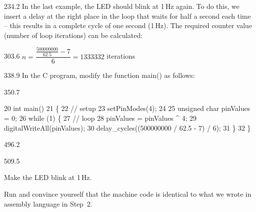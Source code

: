 \documentclass{aslab}
\makeatletter
\newcommand*\aN[1]{\textcolor{codeorange}{#1}}%
\newcommand*\aI[1]{\textcolor{codegreen}{#1}}%
\newcommand*\aK[1]{\textcolor{codered}{#1}}%
\newcommand*\aC[1]{\textcolor{codepurple}{#1}}%
\newenvironment{asmlisting}[1][11]{\par
  \edef\asm@bs{\the\baselineskip}\fontsize{#1bp}{\asm@bs}\selectfont
  \ttfamily\asm@setup}{\par}
\makeatother
\begin{document}
\begin{region}[pitch=13.17]{234.2}
In the last example, the LED should blink at 1\,Hz again. To do this, we
insert a delay at the right place in the loop that waits for half a second
each time -- this results in a complete cycle of one second (1\,Hz). The
required counter value (number of loop iterations) can be calculated:
\end{region}

\begin{region}[x=92.7,right=0]{303.6}
\fontsize{13.2bp}{14bp}\selectfont
$n = \dfrac{\frac{500000000}{62.5} - 7}{6} = 1333332$
{\normalsize iterations}
\end{region}

\begin{region}{338.9}
In the C program, modify the function main() as follows:
\end{region}

\begin{region}[pitch=10]{350.7}
\begin{asmlisting}[9]
 \aN{20} \aI{int} main()
 \aN{21} \{
 \aN{22}     \aC{// setup}
 \aN{23}     setPinModes(\aK{4});
 \aN{24}
 \aN{25}     \aI{unsigned} \aI{char} pinValues = \aK{0};
 \aN{26}     \aN{while} (\aK{1}) \{
 \aN{27}         \aC{// loop}
 \aN{28}         pinValues = pinValues \textasciicircum{} 4;
 \aN{29}         digitalWriteAll(pinValues);
 \aN{30}         delay\_cycles((\aK{500000000} / \aK{62.5} - \aK{7}) / \aK{6});
 \aN{31}     \}
 \aN{32} \}
\end{asmlisting}
\end{region}

\begin{region}{496.2}
\end{region}

\begin{region}[pitch=13.3]{509.5}
\begin{numlist}
\item Make the LED blink at 1\,Hz.
\item Run  and
  convince yourself that the machine code is identical to what we wrote in
  assembly language in Step~2.
\end{numlist}
\end{region}
\end{document}
